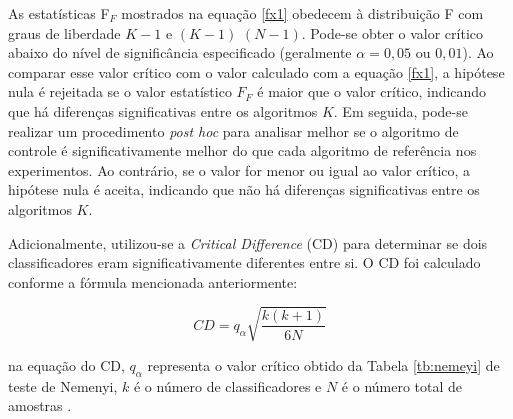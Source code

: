  
As estatísticas F$_F$ mostrados na equação \eqref{fx1} obedecem à distribuição F com graus de liberdade $K-1$ e $(K-1)$ $(N-1)$. Pode-se obter o valor crítico abaixo do nível de significância especificado (geralmente $\alpha = 0,05$ ou $0,01$). Ao comparar esse valor crítico com o valor calculado com a equação \eqref{fx1}, a hipótese nula é rejeitada se o valor estatístico $F_F$ é maior que o valor crítico, indicando que há diferenças significativas entre os algoritmos $K$. Em seguida, pode-se realizar um procedimento \textit{post hoc} para analisar melhor se o algoritmo de controle é significativamente melhor do que cada algoritmo de referência nos experimentos. Ao contrário, se o valor for menor ou igual ao valor crítico, a hipótese nula é aceita, indicando que não há diferenças significativas entre os algoritmos $K$.
  
Adicionalmente, utilizou-se a \textit{Critical Difference} (CD) para determinar se dois classificadores eram significativamente diferentes entre si. O CD foi calculado conforme a fórmula mencionada anteriormente:
 
 \begin{equation}
 	CD = q_\alpha \sqrt{\frac{k(k+1)}{6N}}
 \end{equation}
 
\noindent na equação do CD, $q_\alpha$ representa o valor crítico obtido da Tabela \ref{tb:nemeyi} de teste de Nemenyi, $k$ é o número de classificadores e $N$ é o número total de amostras \cite{Liu2022}.
 
 
 



